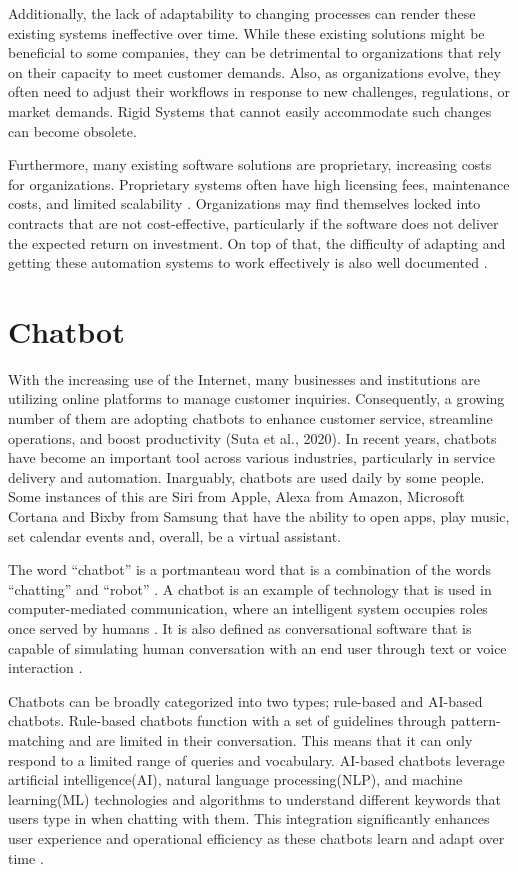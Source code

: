 Additionally, the lack of adaptability to changing processes can render these existing systems ineffective over time. While these existing solutions might be beneficial to some companies, they can be detrimental to organizations that rely on their capacity to meet customer demands\cite{akkermans2003}. Also, as organizations evolve, they often need to adjust their workflows in response to new challenges, regulations, or market demands. Rigid Systems that cannot easily accommodate such changes can become obsolete. 

Furthermore, many existing software solutions are proprietary, increasing costs for organizations. Proprietary systems often have high licensing fees, maintenance costs, and limited scalability \cite{goel2012, prasad2013}. Organizations may find themselves locked into contracts that are not cost-effective, particularly if the software does not deliver the expected return on investment. On top of that, the difficulty of adapting and getting these automation systems to work effectively is also well documented \cite{adams2011, sarker2003, scott2000}.


\section{Chatbot}

With the increasing use of the Internet, many businesses and institutions are utilizing online platforms to manage customer inquiries. Consequently, a growing number of them are adopting chatbots to enhance customer service, streamline operations, and boost productivity (Suta et al., 2020). In recent years, chatbots have become an important tool across various industries, particularly in service delivery and automation. Inarguably, chatbots are used daily by some people. Some instances of this are Siri from Apple, Alexa from Amazon, Microsoft Cortana and Bixby from Samsung that have the ability to open apps, play music, set calendar events and, overall, be a virtual assistant.

The word “chatbot” is a portmanteau word that is a combination of the words “chatting” and “robot” \cite{rese2020}. A chatbot is an example of technology that is used in computer-mediated communication, where an intelligent system occupies roles once served by humans \cite{beattie2020}. It is also defined as conversational software that is capable of simulating human conversation with an end user through text or voice interaction \cite{Naruzzaman}.

Chatbots can be broadly categorized into two types; rule-based and AI-based chatbots. Rule-based chatbots function with a set of guidelines through pattern-matching and are limited in their conversation. This means that it can only respond to a limited range of queries and vocabulary. AI-based chatbots leverage artificial intelligence(AI), natural language processing(NLP), and machine learning(ML) technologies and algorithms to understand different keywords that users type in when chatting with them. This integration significantly enhances user experience and operational efficiency as these chatbots learn and adapt over time \cite{Kar2016}.

